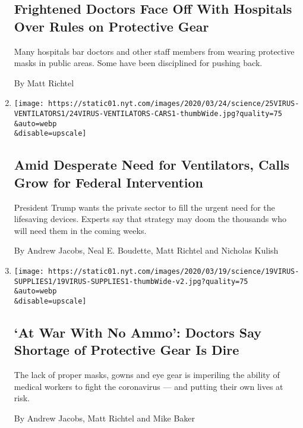 \begin{enumerate}
  \hypertarget{frightened-doctors-face-off-with-hospitals-over-rules-on-protective-gear}{%
  \subsection{Frightened Doctors Face Off With Hospitals Over Rules on
  Protective
  Gear}\label{frightened-doctors-face-off-with-hospitals-over-rules-on-protective-gear}}

  Many hospitals bar doctors and other staff members from wearing
  protective masks in public areas. Some have been disciplined for
  pushing back.

  By Matt Richtel
\item
  \href{/2020/03/25/health/ventilators-coronavirus.html}{}

  \texttt{[image: https://static01.nyt.com/images/2020/03/24/science/25VIRUS-VENTILATORS1/24VIRUS-VENTILATORS-CARS1-thumbWide.jpg?quality=75\\\&auto=webp\\\&disable=upscale]}

  \hypertarget{amid-desperate-need-for-ventilators-calls-grow-for-federal-intervention}{%
  \subsection{Amid Desperate Need for Ventilators, Calls Grow for
  Federal
  Intervention}\label{amid-desperate-need-for-ventilators-calls-grow-for-federal-intervention}}

  President Trump wants the private sector to fill the urgent need for
  the lifesaving devices. Experts say that strategy may doom the
  thousands who will need them in the coming weeks.

  By Andrew Jacobs, Neal E. Boudette, Matt Richtel and Nicholas Kulish
\item
  \href{/2020/03/19/health/coronavirus-masks-shortage.html}{}

  \texttt{[image: https://static01.nyt.com/images/2020/03/19/science/19VIRUS-SUPPLIES1/19VIRUS-SUPPLIES1-thumbWide-v2.jpg?quality=75\\\&auto=webp\\\&disable=upscale]}

  \hypertarget{at-war-with-no-ammo-doctors-say-shortage-of-protective-gear-is-dire}{%
  \subsection{`At War With No Ammo': Doctors Say Shortage of Protective
  Gear Is
  Dire}\label{at-war-with-no-ammo-doctors-say-shortage-of-protective-gear-is-dire}}

  The lack of proper masks, gowns and eye gear is imperiling the ability
  of medical workers to fight the coronavirus --- and putting their own
  lives at risk.

  By Andrew Jacobs, Matt Richtel and Mike Baker
\end{enumerate}

